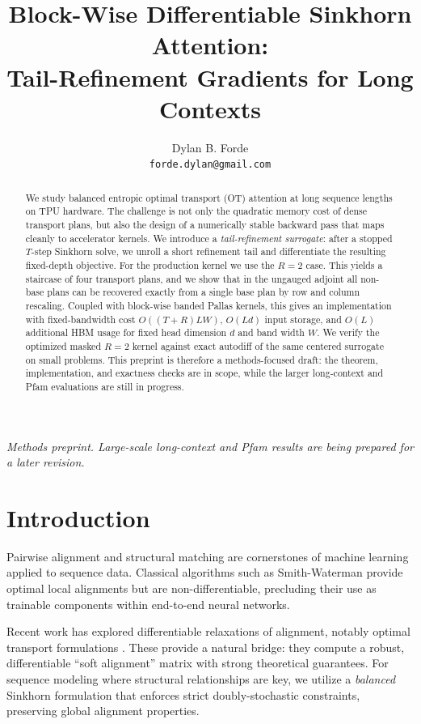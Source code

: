 \documentclass{article}
\title{Block-Wise Differentiable Sinkhorn Attention:\\Tail-Refinement Gradients for Long Contexts}
\author{
Dylan B. Forde \\
\texttt{forde.dylan@gmail.com}
}
\date{}
\begin{document}
\maketitle
\begin{center}
\small\textit{Methods preprint. Large-scale long-context and Pfam results are being prepared for a later revision.}
\end{center}

\begin{abstract}
We study balanced entropic optimal transport (OT) attention at long sequence lengths on TPU hardware. The challenge is not only the quadratic memory cost of dense transport plans, but also the design of a numerically stable backward pass that maps cleanly to accelerator kernels. We introduce a \textit{tail-refinement surrogate}: after a stopped $T$-step Sinkhorn solve, we unroll a short refinement tail and differentiate the resulting fixed-depth objective. For the production kernel we use the $R=2$ case. This yields a staircase of four transport plans, and we show that in the ungauged adjoint all non-base plans can be recovered exactly from a single base plan by row and column rescaling. Coupled with block-wise banded Pallas kernels, this gives an implementation with fixed-bandwidth cost $O((T+R)LW)$, $O(Ld)$ input storage, and $O(L)$ additional HBM usage for fixed head dimension $d$ and band width $W$. We verify the optimized masked $R=2$ kernel against exact autodiff of the same centered surrogate on small problems. This preprint is therefore a methods-focused draft: the theorem, implementation, and exactness checks are in scope, while the larger long-context and Pfam evaluations are still in progress.
\end{abstract}

\section{Introduction}

Pairwise alignment and structural matching are cornerstones of machine learning applied to sequence data. Classical algorithms such as Smith-Waterman \citep{smith1981identification} provide optimal local alignments but are non-differentiable, precluding their use as trainable components within end-to-end neural networks.

Recent work has explored differentiable relaxations of alignment, notably optimal transport formulations \citep{peyre2019computational, cuturi2013sinkhorn}. These provide a natural bridge: they compute a robust, differentiable ``soft alignment'' matrix with strong theoretical guarantees. For sequence modeling where structural relationships are key, we utilize a \textit{balanced} Sinkhorn formulation that enforces strict doubly-stochastic constraints, preserving global alignment properties.
\end{document}
